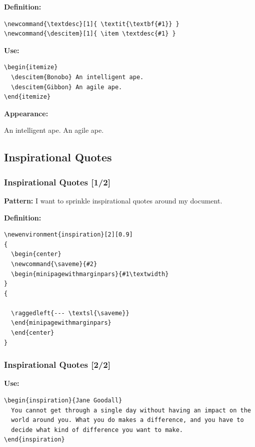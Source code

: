 {\begin{frame}[fragile]
  \pause
  \vspace{3mm}
  \textbf{Definition:}
  \begin{verbatim}
\newcommand{\textdesc}[1]{ \textit{\textbf{#1}} }
\newcommand{\descitem}[1]{ \item \textdesc{#1} }
  \end{verbatim}
  
  \vspace{2mm}
  \textbf{Use:}
  \begin{verbatim}
\begin{itemize}
  \descitem{Bonobo} An intelligent ape.
  \descitem{Gibbon} An agile ape.
\end{itemize}
  \end{verbatim}
  
  \pause
  \vspace{2mm}
  \textbf{Appearance:}
  \begin{itemize}
     An intelligent ape.
     An agile ape.
  \end{itemize}
\end{frame}

\subsection{Inspirational Quotes}
\begin{frame}[fragile]
  \frametitle{Inspirational Quotes [1/2]}
  \vspace{3mm}
  \textbf{Pattern:} I want to sprinkle inspirational quotes around my document.
  
  \pause
  \vspace{5mm}
  \textbf{Definition:}
  \begin{verbatim}
\newenvironment{inspiration}[2][0.9]
{
  \begin{center}
  \newcommand{\saveme}{#2}
  \begin{minipagewithmarginpars}{#1\textwidth}
}
{
  
  \raggedleft{--- \textsl{\saveme}}
  \end{minipagewithmarginpars}
  \end{center}
}
  \end{verbatim}
\end{frame}
\begin{frame}[fragile]
  \frametitle{Inspirational Quotes [2/2]}
  \vspace{3mm}
  \textbf{Use:}
  \begin{verbatim}
\begin{inspiration}{Jane Goodall}
  You cannot get through a single day without having an impact on the
  world around you. What you do makes a difference, and you have to
  decide what kind of difference you want to make.
\end{inspiration}
  \end{verbatim}
  

\end{frame}}
